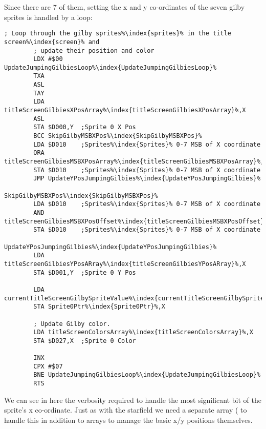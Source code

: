 Since there are 7 of them, setting the x and y co-ordinates of the seven gilby sprites is handled by a loop:

\begin{lstlisting}[caption= The loop in \icode{UpdateJumpingGilbyPositionsAndColors\index{UpdateJumpingGilbyPositionsAndColors}} updating the x and y position on screen\index{screen} and color of each of the gilby sprites\index{sprites}.,escapechar=\%]
        ; Loop through the gilby sprites%\index{sprites}% in the title screen%\index{screen}% and
        ; update their position and color
        LDX #$00
UpdateJumpingGilbiesLoop%\index{UpdateJumpingGilbiesLoop}%   
        TXA
        ASL
        TAY
        LDA titleScreenGilbiesXPosArray%\index{titleScreenGilbiesXPosArray}%,X
        ASL
        STA $D000,Y  ;Sprite 0 X Pos
        BCC SkipGilbyMSBXPos%\index{SkipGilbyMSBXPos}%
        LDA $D010    ;Sprites%\index{Sprites}% 0-7 MSB of X coordinate
        ORA titleScreenGilbiesMSBXPosArray%\index{titleScreenGilbiesMSBXPosArray}%,X
        STA $D010    ;Sprites%\index{Sprites}% 0-7 MSB of X coordinate
        JMP UpdateYPosJumpingGilbies%\index{UpdateYPosJumpingGilbies}%

SkipGilbyMSBXPos%\index{SkipGilbyMSBXPos}%   
        LDA $D010    ;Sprites%\index{Sprites}% 0-7 MSB of X coordinate
        AND titleScreenGilbiesMSBXPosOffset%\index{titleScreenGilbiesMSBXPosOffset}%,X
        STA $D010    ;Sprites%\index{Sprites}% 0-7 MSB of X coordinate

UpdateYPosJumpingGilbies%\index{UpdateYPosJumpingGilbies}%
        LDA titleScreenGilbiesYPosARray%\index{titleScreenGilbiesYPosARray}%,X
        STA $D001,Y  ;Sprite 0 Y Pos

        LDA currentTitleScreenGilbySpriteValue%\index{currentTitleScreenGilbySpriteValue}%
        STA Sprite0Ptr%\index{Sprite0Ptr}%,X

        ; Update Gilby color.
        LDA titleScreenColorsArray%\index{titleScreenColorsArray}%,X
        STA $D027,X  ;Sprite 0 Color

        INX
        CPX #$07
        BNE UpdateJumpingGilbiesLoop%\index{UpdateJumpingGilbiesLoop}%
        RTS
\end{lstlisting}
We can see in here the verbosity required to handle the most significant bit of the sprite's x co-ordinate. Just
as with the starfield we need a separate array ( to handle this in addition
to arrays to manage the basic x/y positions themselves.

